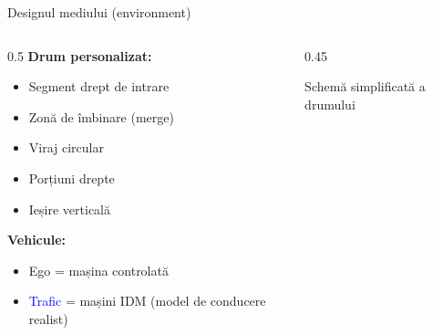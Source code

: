 \documentclass[aspectratio=169]{beamer}
\begin{document}
\begin{frame}{Designul mediului (environment)}
  \begin{columns}
    \begin{column}{0.5\textwidth}
      \textbf{Drum personalizat:}
      \begin{itemize}
        \item Segment drept de intrare
        \item Zonă de îmbinare (merge)
        \item Viraj circular
        \item Porțiuni drepte
        \item Ieșire verticală
      \end{itemize}
      
      \vspace{0.3cm}
      \textbf{Vehicule:}
      \begin{itemize}
        \item \textcolor{yellow!80!black}{Ego} = mașina controlată
        \item \textcolor{blue}{Trafic} = mașini IDM (model de conducere realist)
      \end{itemize}
    \end{column}
    \begin{column}{0.45\textwidth}
      \centering
      
      {\footnotesize Schemă simplificată a drumului}
    \end{column}
  \end{columns}
\end{frame}
\end{document}
